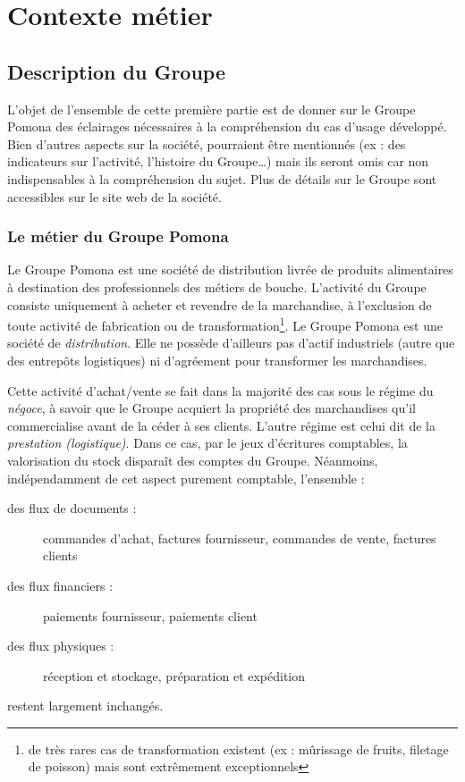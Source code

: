 \part{Contexte métier}

    \chapter{Description du Groupe}

    \large
    L'objet de l'ensemble de cette première partie est de donner sur le Groupe Pomona des éclairages nécessaires à la compréhension du cas d'usage développé.
    Bien d'autres aspects sur la société, pourraient être mentionnés (ex : des indicateurs sur l'activité, l'histoire du Groupe\dots) mais ils seront omis car non indispensables à la compréhension du sujet.
    Plus de détails sur le Groupe sont accessibles sur le site web de la société\cite{site_pomona}.
    \normalsize    

        \section{Le métier du Groupe Pomona}
        \label{business}

        Le Groupe Pomona est une société de distribution livrée de produits alimentaires à destination des professionnels des métiers de bouche.
        L'activité du Groupe consiste uniquement à acheter et revendre de la marchandise, à l'exclusion de toute activité de fabrication ou de transformation\footnote{de très rares cas de transformation existent (ex : mûrissage de fruits, filetage de poisson) mais sont extrêmement exceptionnels}. Le Groupe Pomona est une société de \emph{distribution}. Elle ne possède d'ailleurs pas d'actif industriels (autre que des entrepôts logistiques) ni d'agréement pour transformer les marchandises.        
        
        Cette activité d'achat/vente se fait dans la majorité des cas sous le régime du \emph{négoce}, à savoir que le Groupe acquiert la propriété des marchandises qu'il commercialise avant de la céder à ses clients.
        L'autre régime est celui dit de la \emph{prestation (logistique)}.
        Dans ce cas, par le jeux d'écritures comptables, la valorisation du stock disparaît des comptes du Groupe.
        Néanmoins, indépendamment de cet aspect purement comptable, l'ensemble :
        \begin{description}
            \item[des flux de documents :] commandes d'achat, factures fournisseur, commandes de vente, factures clients
            \item[des flux financiers :] paiements fournisseur, paiements client
            \item[des flux physiques :] réception et stockage, préparation et expédition
        \end{description}
        restent largement inchangés.
        
